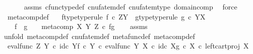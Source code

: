 \begin{isabellebody}
\ \ \ \ \isamarkupfalse%
\ assms\ cfunc{\isacharunderscore}{\kern0pt}type{\isacharunderscore}{\kern0pt}def\ cnufatem{\isacharunderscore}{\kern0pt}def{}\ cnufatem{\isacharunderscore}{\kern0pt}type\ domain{\isacharunderscore}{\kern0pt}comp\ \isamarkupfalse%
\ force\isanewline
{}\isamarkupfalse%
%
\endisatagproof
{\isafoldproof}%
%
\isadelimproof
\isanewline
%
\endisadelimproof
\isanewline
{}\isamarkupfalse%
\ meta{\isacharunderscore}{\kern0pt}comp{}{\isacharunderscore}{\kern0pt}def{}{\isacharcolon}{\kern0pt}\isanewline
\ \ \ f{\isacharunderscore}{\kern0pt}type{\isacharbrackleft}{\kern0pt}type{\isacharunderscore}{\kern0pt}rule{\isacharbrackright}{\kern0pt}{\isacharcolon}{\kern0pt}\ {\isachardoublequoteopen}f\ {\isasymin}\isactrlsub c\ Z\isactrlbsup Y\isactrlesup {\isachardoublequoteclose}\ \ g{\isacharunderscore}{\kern0pt}type{\isacharbrackleft}{\kern0pt}type{\isacharunderscore}{\kern0pt}rule{\isacharbrackright}{\kern0pt}{\isacharcolon}{\kern0pt}\ {\isachardoublequoteopen}g\ {\isasymin}\isactrlsub c\ Y\isactrlbsup X\isactrlesup {\isachardoublequoteclose}\isanewline
\ \ \ {\isachardoublequoteopen}f\ {\isasymbox}\ g\ \ \ {\isacharequal}{\kern0pt}\ meta{\isacharunderscore}{\kern0pt}comp\ X\ Y\ Z\ {\isasymcirc}\isactrlsub c\ {\isasymlangle}f{\isacharcomma}{\kern0pt}g{\isasymrangle}{\isachardoublequoteclose}\isanewline
%
\isadelimproof
\ \ %
\endisadelimproof
%
\isatagproof
{}\isamarkupfalse%
\ assms\ \isanewline
{}\isamarkupfalse%
{\isacharparenleft}{\kern0pt}unfold\ meta{\isacharunderscore}{\kern0pt}comp{}{\isacharunderscore}{\kern0pt}def{}\ cnufatem{\isacharunderscore}{\kern0pt}def{}\ metafunc{\isacharunderscore}{\kern0pt}def\ meta{\isacharunderscore}{\kern0pt}comp{\isacharunderscore}{\kern0pt}def{\isacharparenright}{\kern0pt}\ \ \ \ \ \ \ \ \ \ \isanewline
\ \ \isamarkupfalse%
\ {\isachardoublequoteopen}{\isacharparenleft}{\kern0pt}{\isacharparenleft}{\kern0pt}{\isacharparenleft}{\kern0pt}eval{\isacharunderscore}{\kern0pt}func\ Z\ Y\ {\isasymcirc}\isactrlsub c\ {\isasymlangle}id\isactrlsub c\ Y{\isacharcomma}{\kern0pt}f\ {\isasymcirc}\isactrlsub c\ {\isasymbeta}\isactrlbsub Y\isactrlesub {\isasymrangle}{\isacharparenright}{\kern0pt}\ {\isasymcirc}\isactrlsub c\ eval{\isacharunderscore}{\kern0pt}func\ Y\ X\ {\isasymcirc}\isactrlsub c\ {\isasymlangle}id\isactrlsub c\ X{\isacharcomma}{\kern0pt}g\ {\isasymcirc}\isactrlsub c\ {\isasymbeta}\isactrlbsub X\isactrlesub {\isasymrangle}{\isacharparenright}{\kern0pt}\ {\isasymcirc}\isactrlsub c\ left{\isacharunderscore}{\kern0pt}cart{\isacharunderscore}{\kern0pt}proj\ X\ {\isasymone}{\isacharparenright}{\kern0pt}\ {\isacharequal}{\kern0pt}\ \ \isanewline

\end{isabellebody}
